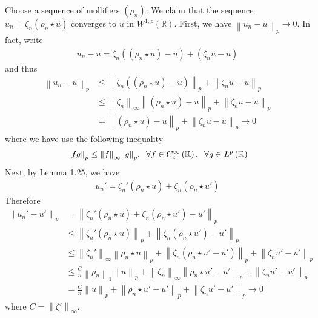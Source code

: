 \documentclass[a4paper,oneside]{book}
\numberwithin{equation}{chapter}
\begin{document}
Choose a sequence of mollifiers $\left(\rho _n\right)$. We claim that the sequence ${u_n} = {\zeta _n}\left( {{\rho _n}\star u} \right)$ converges to $u$ in $W^{1,p}\left(\mathbb{R}\right)$. First, we have ${\left\| {{u_n} - u} \right\|_p} \to 0$. In fact, write
\begin{align}
{u_n} - u = {\zeta _n}\left( {\left( {{\rho _n}\star u} \right) - u} \right) + \left( {{\zeta _n}u - u} \right)
\end{align}
and thus
\begin{align}
\label{1.244}
{\left\| {{u_n} - u} \right\|_p} &\le {\left\| {{\zeta _n}\left( {\left( {{\rho _n}\star u} \right) - u} \right)} \right\|_p} + {\left\| {{\zeta _n}u - u} \right\|_p}\\
& \le {\left\| {{\zeta _n}} \right\|_{\infty}}{\left\| {\left( {{\rho _n}\star u} \right) - u} \right\|_p} + {\left\| {{\zeta _n}u - u} \right\|_p}\\
& = {\left\| {\left( {{\rho _n}\star u} \right) - u} \right\|_p} + {\left\| {{\zeta _n}u - u} \right\|_p} \to 0 \label{1.246}
\end{align}
where we have use the following inequality
\begin{align}
{\left\| {fg} \right\|_p} \le {\left\| f \right\|_\infty }{\left\| g \right\|_p},\hspace{0.2cm} \forall f \in C_c^\infty \left( \mathbb{R} \right),\hspace{0.2cm} \forall g \in {L^p}\left( \mathbb{R} \right)
\end{align}
Next, by Lemma 1.25, we have
\begin{align}
{u_n}' = {\zeta _n}'\left( {{\rho _n}\star u} \right) + {\zeta _n}\left( {{\rho _n}\star u'} \right)
\end{align}
Therefore
\begin{align}
\label{1.249}
{\left\| {{u_n}' - u'} \right\|_p} &= {\left\| {{\zeta _n}'\left( {{\rho _n}\star u} \right) + {\zeta _n}\left( {{\rho _n}\star u'} \right) - u'} \right\|_p}\\
& \le {\left\| {{\zeta _n}'\left( {{\rho _n}\star u} \right)} \right\|_p} + {\left\| {{\zeta _n}\left( {{\rho _n}\star u'} \right) - u'} \right\|_p}\\
& \le {\left\| {{\zeta _n}'} \right\|_\infty }{\left\| {{\rho _n}\star u} \right\|_p} + {\left\| {{\zeta _n}\left( {{\rho _n}\star u' - u'} \right)} \right\|_p} + {\left\| {{\zeta _n}u' - u'} \right\|_p}\\
& \le \frac{C}{n}{\left\| {{\rho _n}} \right\|_1}{\left\| u \right\|_p} + {\left\| {{\zeta _n}} \right\|_\infty }{\left\| {{\rho _n}\star u' - u'} \right\|_p} + {\left\| {{\zeta _n}u' - u'} \right\|_p}\\
& = \frac{C}{n}{\left\| u \right\|_p} + {\left\| {{\rho _n}\star u' - u'} \right\|_p} + {\left\| {{\zeta _n}u' - u'} \right\|_p} \to 0 \label{1.253}
\end{align}
where $C = {\left\| {\zeta '} \right\|_\infty }$.
\end{document}
